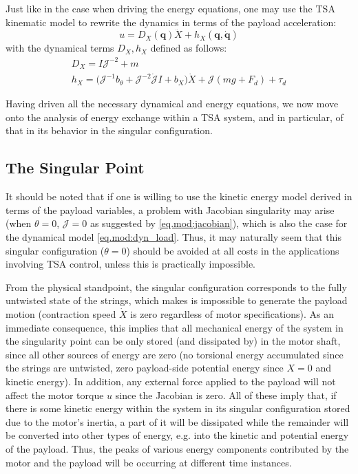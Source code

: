 Just like in the case when driving the energy equations, one may use the TSA kinematic model to rewrite the dynamics in terms of the payload acceleration:
\begin{equation}\label{eq.mod:dyn_load}
u = D_X(\mathbf{q}) \ddot{X} + h_X(\mathbf{q},\dot{\mathbf{q}})
\end{equation}
with the dynamical terms $D_X,h_X$ defined as follows:
\begin{equation*}
\begin{matrix}
D_X = I\mathcal{J}^{-2} + m\\
h_X = \big(\mathcal{J}^{-1} b_\theta + \mathcal{J}^{-2} \dot{\mathcal{J}}I + b_X  \big)\dot{X} + \mathcal{J}(mg  + F_{d}) + \tau_d
\end{matrix}
\end{equation*}

Having driven all the necessary dynamical and energy equations, we now move onto the analysis of energy exchange within a TSA system, and in particular, of that in its behavior in the singular configuration. 



\subsection{The Singular Point}
It should be noted that if one is willing to use the kinetic energy model derived in terms of the payload variables, a problem with Jacobian singularity may arise (when $\theta = 0$, $\mathcal{J} = 0$ as suggested by \eqref{eq.mod:jacobian}), which is also the case for the dynamical model \eqref{eq.mod:dyn_load}. Thus, it may naturally seem that this singular configuration ($\theta = 0$) should be avoided at all costs in the applications involving TSA control, unless this is practically impossible. 

From the physical standpoint, the singular configuration corresponds to the fully untwisted state of the strings, which makes is impossible to generate the payload motion (contraction speed $\dot{X}$ is zero regardless of motor specifications). As an immediate consequence, this implies that all mechanical energy of the system in the singularity point can be only stored (and dissipated by) in the motor shaft, since all other sources of energy are zero (no torsional energy accumulated since the strings are untwisted, zero payload-side potential energy since $X=0$ and kinetic energy). In addition, any external force applied to the payload will not affect the motor torque $u$ since the Jacobian is zero. All of these imply that, if there is some kinetic energy within the system in its singular configuration stored due to the motor's inertia, a part of it will be dissipated while the remainder will be converted into other types of energy, e.g. into the kinetic and potential energy of the payload. Thus, the peaks of various energy components contributed by the motor and the payload will be occurring at different time instances. 

